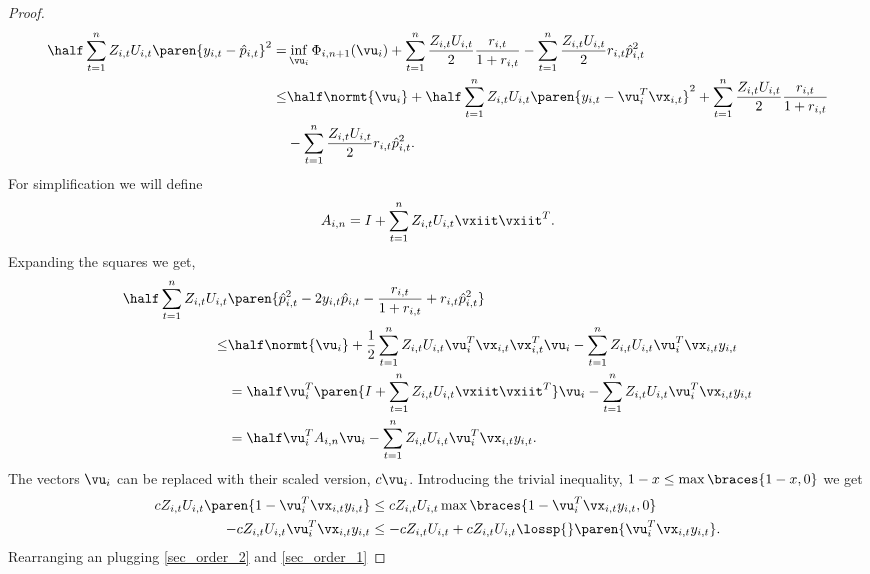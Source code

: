 \begin{proof}
\begin{equation*}
\begin{split}
\half \sum_{t=1}^{n}Z_{i,t}U_{i,t}\paren{y_{i,t}-\hat{p}_{i,t}}^{2}=& \inf_{\vu_i}{\Phi_{i,n+1}}(\vu_i)+ \sum_{t=1}^{n}\frac{Z_{i,t}U_{i,t}}{2}\frac{r_{i,t}}{1+r_{i,t}}-\sum_{t=1}^{n}\frac{Z_{i,t}U_{i,t}}{2}r_{i,t}\hat{p}_{i,t}^2\\
\le&\half\normt{\vu_i}+\half\sum_{t=1}^{n}{Z_{i,t}U_{i,t}\paren{y_{i,t}-\vu_i^T\vx_{i,t}}}^2+ \sum_{t=1}^{n}\frac{Z_{i,t}U_{i,t}}{2}\frac{r_{i,t}}{1+r_{i,t}}\\&-\sum_{t=1}^{n}\frac{Z_{i,t}U_{i,t}}{2}r_{i,t}\hat{p}_{i,t}^2.
\end{split}
\end{equation*} 
For simplification we will define
\begin{equation*}
A_{i,n}=I+\sum_{t=1}^{n}{Z_{i,t}U_{i,t}}\vxiit\vxiit^T.
\end{equation*}
Expanding the squares we get,
\begin{equation}
\begin{split}
\half \sum_{t=1}^{n}Z_{i,t}U_{i,t}&\paren{\hat{p}_{i,t}^2-2y_{i,t}\hat{p}_{i,t}-\frac{r_{i,t}}{1+r_{i,t}}+r_{i,t}\hat{p}_{i,t}^2}\\
\le& \half\normt{\vu_i}+\frac{1}{2}\sum_{t=1}^{n}{Z_{i,t}U_{i,t}\vu_i^T\vx_{i,t}\vx_{i,t}^T\vu_i}-\sum_{t=1}^{n}{Z_{i,t}U_{i,t}\vu_i^T\vx_{i,t}y_{i,t}}\\
&=\half \vu_i^T\paren{I+\sum_{t=1}^{n}{Z_{i,t}U_{i,t}}\vxiit\vxiit^T}\vu_i-\sum_{t=1}^{n}{Z_{i,t}U_{i,t}\vu_i^T\vx_{i,t}y_{i,t}}\\
&=\half \vu_i^T A_{i,n} \vu_i-\sum_{t=1}^{n}{Z_{i,t}U_{i,t}\vu_i^T\vx_{i,t}y_{i,t}}.
\end{split}
\label{sec_order_1}
\end{equation} 
The vectors $\vu_i$ can be replaced with their scaled version, $c\vu_i$. 
Introducing the trivial inequality, $1-x\le \max\braces{1-x,0}$ we get 
\begin{equation}
\begin{split}
cZ_{i,t}U_{i,t}\paren{1-\vu_i^T\vx_{i,t}y_{i,t}} &\le cZ_{i,t}U_{i,t}\max\braces{1-\vu_i^T\vx_{i,t}y_{i,t},0}\\
-cZ_{i,t}U_{i,t}\vu_i^T\vx_{i,t}y_{i,t}&\le-cZ_{i,t}U_{i,t}+c Z_{i,t}U_{i,t}\lossp{}\paren{\vu_i^T\vx_{i,t}y_{i,t}}.
\label{sec_order_2}
\end{split}
\end{equation}
Rearranging an plugging \eqref{sec_order_2} and \eqref{sec_order_1} 


\end{proof}
